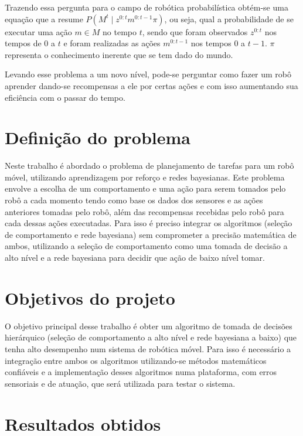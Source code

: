 Trazendo essa pergunta para o campo de robótica probabilística obtém-se uma equação que a resume $ P \left( M^t \mid z^{0: t} m^{0: t -1} \pi \right) $, ou seja, qual a probabilidade de se executar uma ação $ m \in M $ no tempo $ t $, sendo que foram observados $ z^{0:t} $ nos tempos de $ 0 $ a $ t $ e foram realizadas as ações $ m^{0:t-1} $ nos tempos $ 0 $ a $ t-1 $. $ \pi $ representa o conhecimento inerente que se tem dado do mundo.

Levando esse problema a um novo nível, pode-se perguntar como fazer um robô aprender dando-se recompensas a ele por certas ações e com isso aumentando sua eficiência com o passar do tempo.


\section{Definição do problema}

Neste trabalho é abordado o problema de planejamento de tarefas para um robô móvel, utilizando aprendizagem por reforço e redes bayesianas. Este problema envolve a escolha de um comportamento e uma ação para serem tomados pelo robô a cada momento tendo como base os dados dos sensores e as ações anteriores tomadas pelo robô, além das recompensas recebidas pelo robô para cada dessas ações executadas. Para isso é preciso integrar os algoritmos (seleção de comportamento e rede bayesiana) sem comprometer a precisão matemática de ambos, utilizando a seleção de comportamento como uma tomada de decisão a alto nível e a rede bayesiana para decidir que ação de baixo nível tomar.


\section{Objetivos do projeto}

O objetivo principal desse trabalho é obter um algoritmo de tomada de decisões hierárquico (seleção de comportamento a alto nível e rede bayesiana a baixo) que tenha alto desempenho num sistema de robótica móvel. Para isso é necessário a integração entre ambos os algoritmos utilizando-se métodos matemáticos confiáveis e a implementação desses algoritmos numa plataforma, com erros sensoriais e de atuação, que será utilizada para testar o sistema.


\section{Resultados obtidos}

